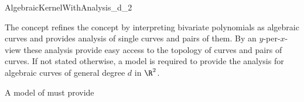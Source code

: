 \begin{ccRefConcept}{AlgebraicKernelWithAnalysis_d_2} 

\ccDefinition

The  concept refines
the  concept by interpreting bivariate polynomials
as algebraic curves and provides analysis of single curves and pairs of them.
By an $y$-per-$x$-view 
these analysis provide easy access to the topology of curves and pairs of
curves. If not stated otherwise, a model is required to 
provide the analysis for algebraic curves of general degree $d$ in $\R^2$.

\ccRefines
{}

\ccTypes

A model of  must provide

\ccGlue
{}

\ccHasModels


\ccSeeAlso



\end{ccRefConcept}
